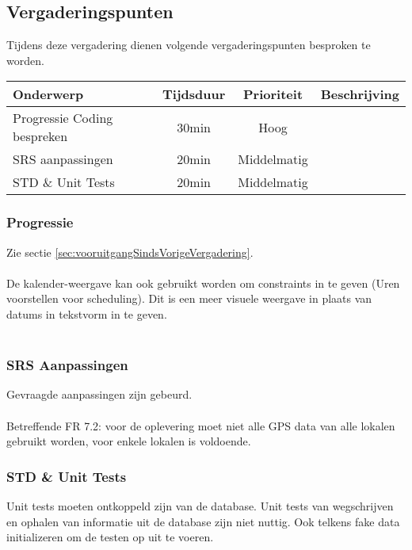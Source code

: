 \subsection{Vergaderingspunten}
Tijdens deze vergadering dienen volgende vergaderingspunten besproken te worden.
\begin{table} [H]
	\centering
	\begin{tabular} {l|c|c|c}
		Onderwerp & Tijdsduur & Prioriteit & Beschrijving \\ %
		\hline
		Progressie Coding bespreken & 30min & Hoog & \\
		SRS aanpassingen & 20min & Middelmatig & \\
		STD \& Unit Tests & 20min & Middelmatig & \\
	\end{tabular}
\end{table}
\subsubsection{Progressie}
Zie sectie \ref{sec:vooruitgangSindsVorigeVergadering}.
\\
\\
De kalender-weergave kan ook gebruikt worden om constraints in te geven (Uren voorstellen voor scheduling). Dit is een meer visuele weergave in plaats van datums in tekstvorm in te geven.
\\
\\


\subsubsection{SRS Aanpassingen}
Gevraagde aanpassingen zijn gebeurd.
\\
\\
Betreffende FR 7.2: voor de oplevering moet niet alle GPS data van alle lokalen gebruikt worden, voor enkele lokalen is voldoende.

\subsubsection{STD \& Unit Tests}
Unit tests moeten ontkoppeld zijn van de database. Unit tests van wegschrijven en ophalen van informatie uit de database zijn niet nuttig. Ook telkens fake data initializeren om de testen op uit te voeren.

